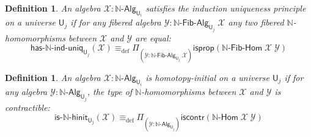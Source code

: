 \documentclass[reqno,10pt,a4paper,oneside]{amsart}
\numberwithin{equation}{section}
\theoremstyle{mythm}
\theoremstyle{mydef}
\newtheorem{definition}[theorem]{Definition}
\theoremstyle{myrmk}
\newcommand{\deq}{\equiv}
\newcommand{\defeq}{\deq_{\mathrm{def}}}
\newcommand{\iscontr}{\mathsf{iscontr}}
\newcommand{\isprop}{\mathsf{isprop}}
\newcommand{\prd}[1]{\Pi_{#1}}
\newcommand{\nat}{\ensuremath{\mathbb{N}}}
\newcommand{\UU}{\mathsf{U}}
\newcommand{\NatAlg}{\nat\text{-}\mathsf{Alg}}
\newcommand{\NatHom}{\nat\text{-}\mathsf{Hom}}
\newcommand{\HasNatIndUniq}{\mathsf{has}\text{-}\nat\text{-}\mathsf{ind}\text{-}\mathsf{uniq}}
\newcommand{\NatFibAlg}{\nat\text{-}\mathsf{Fib}\text{-}\mathsf{Alg}}
\newcommand{\NatFibHom}{\nat\text{-}\mathsf{Fib}\text{-}\mathsf{Hom}}
\newcommand{\IsNatHInit}{\mathsf{is}\text{-}\nat\text{-}\mathsf{hinit}}
\newcommand{\X}{\mathcal{X}}
\newcommand{\Y}{\mathcal{Y}}
\begin{document}
\begin{definition}\label{def:NatIndUniq}
An algebra $\X : \NatAlg_{\UU_i}$ satisfies the \emph{induction uniqueness principle} on a universe $\UU_j$ if for any fibered algebra $\Y : \NatFibAlg_{\UU_j}\;\X$ any two fibered $\nat$-homomorphisms between $\X$ and $\Y$ are equal:
\[ \HasNatIndUniq_{\UU_j}(\X) \defeq \prd{(\Y:\NatFibAlg_{\UU_j} \; \X)} \isprop(\NatFibHom \; \X \; \Y)\]
\end{definition}

\begin{definition}\label{def:NatInit}
An algebra $\X : \NatAlg_{\UU_i}$ is \emph{homotopy-initial} on a universe $\UU_j$ if for any algebra $\Y : \NatAlg_{\UU_j}$, the type of $\nat$-homomorphisms between $\X$ and $\Y$ is contractible:
\[ \IsNatHInit_{\UU_j}(\X) \defeq \prd{(\Y:\NatAlg_{\UU_j})} \iscontr(\NatHom \; \X \; \Y) \]  
\end{definition}
\end{document}
